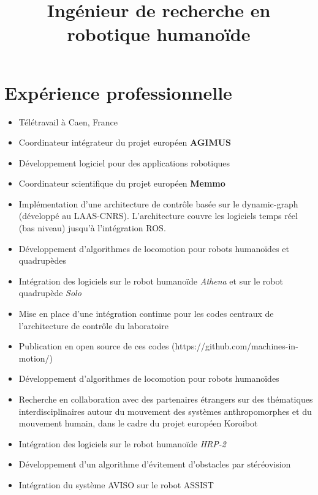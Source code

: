 \documentclass[11pt,a4paper]{moderncv}
\title{Ingénieur de recherche en robotique humanoïde}
\newcommand{\items}{\item[*] \hspace{2mm}}
\begin{document}
\maketitle

\section{Expérience professionnelle}

{
  \begin{itemize}
    \items Télétravail à Caen, France
    \items Coordinateur intégrateur du projet européen \textbf{AGIMUS}
    \items Développement logiciel pour des applications robotiques
  \end{itemize}
}

{
  \begin{itemize}
    \items Coordinateur scientifique du projet européen \textbf{Memmo}
  \end{itemize}
}

{
  \begin{itemize}
    \items Implémentation d'une architecture de contrôle basée sur le dynamic-graph (développé au LAAS-CNRS). L'architecture couvre les logiciels temps réel (bas niveau) jusqu'à l'intégration ROS.
    \items Développement d'algorithmes de locomotion pour robots humanoïdes et quadrupèdes
    \items Intégration des logiciels sur le robot humanoïde \emph{Athena} et sur le robot quadrupède \emph{Solo}
    \items Mise en place d'une intégration continue pour les codes centraux de l'architecture de contrôle du laboratoire
    \items Publication en open source de ces codes (https://github.com/machines-in-motion/)
  \end{itemize}
}

{
  \begin{itemize}
    \items Développement d'algorithmes de locomotion pour robots humanoïdes
    \items Recherche en collaboration avec des partenaires étrangers sur des thématiques interdisciplinaires autour du mouvement des systèmes anthropomorphes et du mouvement humain, dans le cadre du projet européen Koroibot
    \items Intégration des logiciels sur le robot humanoïde \emph{HRP-2}
  \end{itemize}
}

{
  \begin{itemize}
    \items Développement d'un algorithme d'évitement d'obstacles par stéréovision
    \items Intégration du système AVISO sur le robot ASSIST
  \end{itemize}
}
\end{document}
